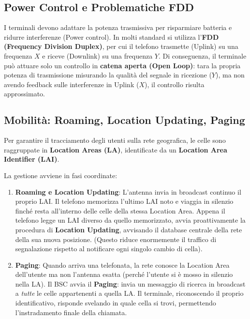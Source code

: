 \subsection{Power Control e Problematiche FDD}
I terminali devono adattare la potenza trasmissiva per risparmiare batteria e ridurre interferenze (Power control). 
In molti standard si utilizza l'\textbf{FDD (Frequency Division Duplex)}, per cui il telefono trasmette (Uplink) su una frequenza $X$ e riceve (Downlink) su una frequenza $Y$. Di conseguenza, il terminale può attuare solo un controllo in \textbf{catena aperta (Open Loop)}: tara la propria potenza di trasmissione misurando la qualità del segnale in ricezione ($Y$), ma non avendo feedback sulle interferenze in Uplink ($X$), il controllo risulta approssimato.

\subsection{Mobilità: Roaming, Location Updating, Paging}
Per garantire il tracciamento degli utenti sulla rete geografica, le celle sono raggruppate in \textbf{Location Areas (LA)}, identificate da un \textbf{Location Area Identifier (LAI)}. 

La gestione avviene in fasi coordinate:
\begin{enumerate}
    \item \textbf{Roaming e Location Updating}: L'antenna invia in broadcast continuo il proprio LAI. Il telefono memorizza l'ultimo LAI noto e viaggia in silenzio finché resta all'interno delle celle della stessa Location Area. Appena il telefono legge un LAI diverso da quello memorizzato, avvia proattivamente la procedura di \textbf{Location Updating}, avvisando il database centrale della rete della sua nuova posizione. (Questo riduce enormemente il traffico di segnalazione rispetto al notificare ogni singolo cambio di cella).
    \item \textbf{Paging}: Quando arriva una telefonata, la rete conosce la Location Area dell'utente ma non l'antenna esatta (perché l'utente si è mosso in silenzio nella LA). Il BSC avvia il \textbf{Paging}: invia un messaggio di ricerca in broadcast a \textit{tutte} le celle appartenenti a quella LA. Il terminale, riconoscendo il proprio identificativo, risponde svelando in quale cella si trovi, permettendo l'instradamento finale della chiamata.
\end{enumerate}

